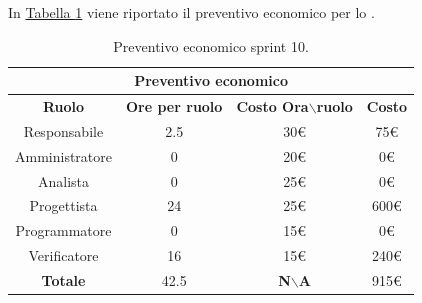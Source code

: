 In \hyperref[tab:sprint10_preventivo_economico]{Tabella \ref{tab:sprint10_preventivo_economico}} viene riportato il preventivo economico per lo .
\begin{table}[H]
    \centering
    \begin{tabular}{|c|c|c|c|}
        \hline
            \multicolumn{4}{|c|}{\textbf{Preventivo economico}} \\ 
        \hline
            \textbf{Ruolo} & \textbf{Ore per ruolo} & \textbf{Costo Ora$\backslash$ruolo} & \textbf{Costo} \\
        \hline
        Responsabile & 2.5 & 30€ & 75€ \\
        \hline
        Amministratore & 0 & 20€ & 0€ \\
        \hline
        Analista & 0 & 25€ & 0€ \\
        \hline
        Progettista & 24 & 25€ & 600€ \\
        \hline
        Programmatore & 0 & 15€ & 0€ \\
        \hline
        Verificatore & 16 & 15€ & 240€ \\
        \hline 
        \textbf{Totale} & 42.5 & \textbf{N$\backslash$A} & 915€  \\
        \hline
    \end{tabular}
    \caption{Preventivo economico sprint 10.}
    \label{tab:sprint10_preventivo_economico}
\end{table}